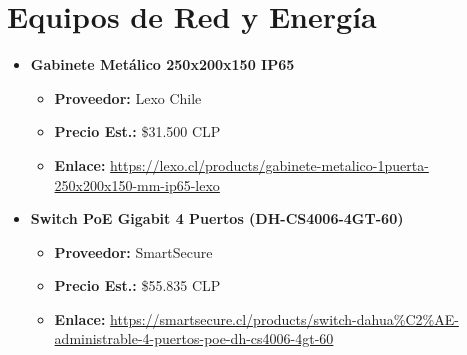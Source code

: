 \section{Equipos de Red y Energía}
\begin{itemize}
    \item \textbf{Gabinete Metálico 250x200x150 IP65}
    \begin{itemize}
        \item \textbf{Proveedor:} Lexo Chile
        \item \textbf{Precio Est.:} \$31.500 CLP
        \item \textbf{Enlace:} \url{https://lexo.cl/products/gabinete-metalico-1puerta-250x200x150-mm-ip65-lexo}
    \end{itemize}
    
    \item \textbf{Switch PoE Gigabit 4 Puertos (DH-CS4006-4GT-60)}
    \begin{itemize}
        \item \textbf{Proveedor:} SmartSecure
        \item \textbf{Precio Est.:} \$55.835 CLP
        \item \textbf{Enlace:} \url{https://smartsecure.cl/products/switch-dahua\%C2\%AE-administrable-4-puertos-poe-dh-cs4006-4gt-60}
    \end{itemize}
\end{itemize}

